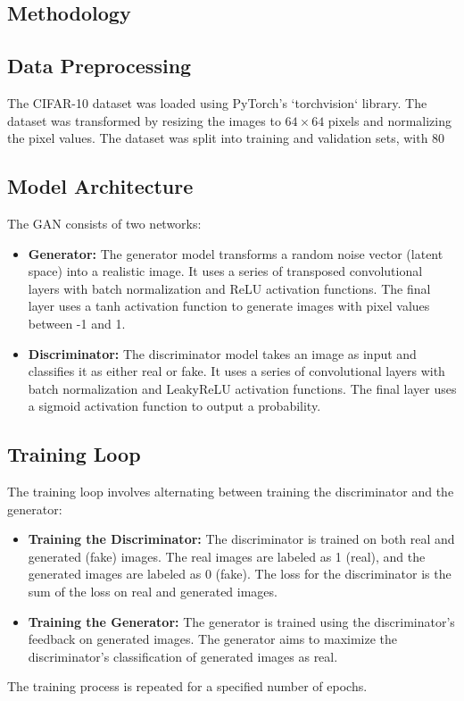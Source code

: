\documentclass{article}
\begin{document}
\subsection{Methodology}

\subsection{Data Preprocessing}
The CIFAR-10 dataset was loaded using PyTorch's `torchvision` library. The dataset was transformed by resizing the images to $64 \times 64$ pixels and normalizing the pixel values. The dataset was split into training and validation sets, with 80%

\subsection{Model Architecture}
The GAN consists of two networks:
\begin{itemize}
    \item \textbf{Generator:} The generator model transforms a random noise vector (latent space) into a realistic image. It uses a series of transposed convolutional layers with batch normalization and ReLU activation functions. The final layer uses a tanh activation function to generate images with pixel values between -1 and 1.
    \item \textbf{Discriminator:} The discriminator model takes an image as input and classifies it as either real or fake. It uses a series of convolutional layers with batch normalization and LeakyReLU activation functions. The final layer uses a sigmoid activation function to output a probability.
\end{itemize}

\subsection{Training Loop}
The training loop involves alternating between training the discriminator and the generator:
\begin{itemize}
    \item \textbf{Training the Discriminator:} The discriminator is trained on both real and generated (fake) images. The real images are labeled as 1 (real), and the generated images are labeled as 0 (fake). The loss for the discriminator is the sum of the loss on real and generated images.
    \item \textbf{Training the Generator:} The generator is trained using the discriminator's feedback on generated images. The generator aims to maximize the discriminator's classification of generated images as real.
\end{itemize}
The training process is repeated for a specified number of epochs.
\end{document}
